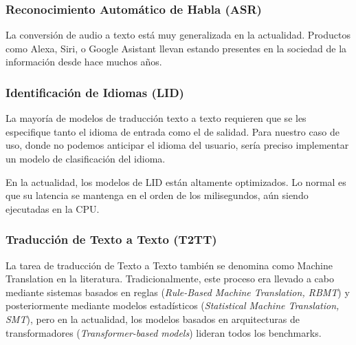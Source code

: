 \subsubsection{Reconocimiento Automático de Habla (ASR)}  
La conversión de audio a texto está muy generalizada en la actualidad. Productos como Alexa, Siri, o Google Asistant llevan estando presentes en la sociedad de la información desde hace muchos años.






\subsubsection{Identificación de Idiomas (LID)}  
La mayoría de modelos de traducción texto a texto requieren que se les especifique tanto el idioma de entrada como el de salidad. Para nuestro caso de uso, donde no podemos anticipar el idioma del usuario, sería preciso implementar un modelo de clasificación del idioma.

En la actualidad, los modelos de LID están altamente optimizados. Lo normal es que su latencia se mantenga en el orden de los milisegundos, aún siendo ejecutadas en la CPU.



\subsubsection{Traducción de Texto a Texto (T2TT)}  
La tarea de traducción de Texto a Texto también se denomina como Machine Translation en la literatura. Tradicionalmente, este proceso era llevado a cabo mediante sistemas basados en reglas (\textit{Rule-Based Machine Translation, RBMT}) y posteriormente mediante modelos estadísticos (\textit{Statistical Machine Translation, SMT}), pero en la actualidad, los modelos basados en arquitecturas de transformadores (\textit{Transformer-based models}) lideran todos los benchmarks.


